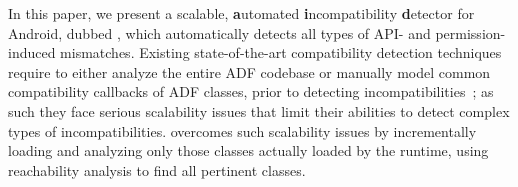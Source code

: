 


\sloppy 
In this paper, we present a scalable, \textbf{a}utomated
\textbf{i}ncom\-patibility \textbf{d}etector for Android, dubbed \@approach, which automatically 
detects all types of API- and permission-induced mismatches.
Existing state-of-the-art compatibility detection techniques
require to either analyze the entire ADF codebase or manually model common compatibility callbacks of ADF classes, prior to detecting incompatibilities~\cite{huang2018understanding,lili2018cid,he2018understanding};
as such they face serious scalability issues that limit their abilities to detect complex types of incompatibilities. 
\@approach overcomes such scalability issues by incrementally loading and analyzing only those classes actually loaded by the runtime, using reachability analysis to find all pertinent classes.






